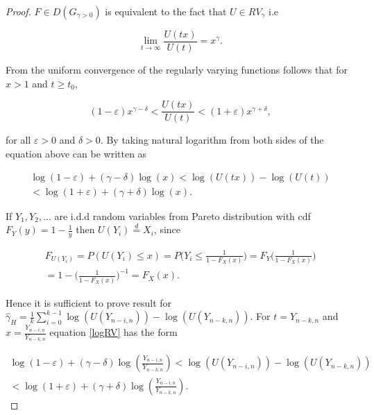 \documentclass[english,12pt,a4paper,pdftex,sci,utf8]{aaltothesis} %
\begin{document}
\begin{proof}

$F \in D(G_{\gamma>0})$ is equivalent to the fact that $U \in RV_{\gamma}$ i.e

\begin{equation}
\lim_{t\to\infty} \frac{U(tx)}{U(t)} = x^{\gamma}.
\end{equation}

From the uniform convergence of the regularly varying functions follows that for $x>1$ and $t \geq t_0$,

\begin{equation}
(1-\varepsilon) x^{\gamma - \delta} < \frac{U(tx)}{U(t)} < (1+\varepsilon) x^{\gamma + \delta},
\label{RVnoteq}
\end{equation}

for all $\varepsilon>0$ and $\delta>0$. By taking natural logarithm from both sides of the equation above can be written as

\begin{equation}
\begin{split}
\log(1 - \varepsilon) + (\gamma - \delta) \log(x) < \log(U(tx)) - \log(U(t)) \\
< \log(1 + \varepsilon) + (\gamma + \delta) \log(x).
\end{split}
\label{logRV}
\end{equation}

If $Y_1, Y_2,...$ are i.d.d random variables from Pareto distribution with cdf $F_Y(y) = 1 - \frac{1}{y}$ then $U(Y_i)  \overset{d}{=} X_i$, since



\begin{equation*}
\begin{split}
F_{U(Y_i)} = P(U(Y_i) \leq x) = P\Big(Y_i \leq \frac{1}{1-F_X(x)}\Big) = F_Y\Big(\frac{1}{1-F_X(x)}\Big) \\
= 1-\Big(\frac{1}{1-F_X(x)}\Big)^{-1} =F_X(x).
\end{split}
\end{equation*}

Hence it is sufficient to prove result for $ \hat{\gamma}_H =  \frac{1}{k} \sum_{i=0}^{k-1} \log(U(Y_{n-i,n})) - \log(U(Y_{n-k,n})) $. For $t = Y_{n-k,n}$ and $x =\frac{Y_{n-i,n}}{Y_{n-k,n}}$ equation \ref{logRV} has the form

\begin{equation}
\begin{split}
\log(1 - \varepsilon) + (\gamma - \delta) \log(\frac{Y_{n-i,n}}{Y_{n-k,n}}) < \log(U(Y_{n-i,n})) - \log(U(Y_{n-k,n})) \\
< \log(1 + \varepsilon) + (\gamma + \delta) \log(\frac{Y_{n-i,n}}{Y_{n-k,n}}).
\end{split}
\label{log}
\end{equation}


\end{proof}
\end{document}
